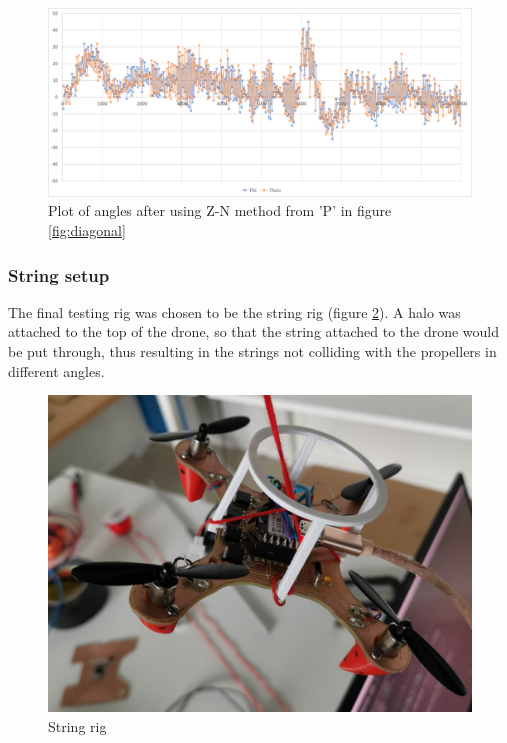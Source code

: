 \begin{figure}[h!]
    \centering
    \includegraphics[width=\textwidth]{pictures/graphs/ZN.png}
    \caption{Plot of angles after using Z-N method from 'P' in figure \ref{fig:diagonal}}
    \label{fig:ZN}
\end{figure}

\newpage
\subsubsection{String setup}
The final testing rig was chosen to be the string rig (figure \ref{fig:string_rig}). A halo was attached to the top of the drone, so that the string attached to the drone would be put through, thus resulting in the strings not colliding with the propellers in different angles.

\begin{figure}[h]
    \centering
    \includegraphics[width=\textwidth]{pictures/String_rig.jpg}
    \caption{String rig}
    \label{fig:string_rig}
\end{figure}

